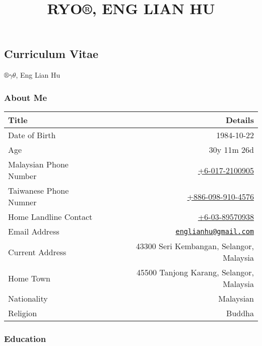 \documentclass[]{article}
\title{RYO®, ENG LIAN HU}
\author{}
\date{}
\begin{document}
\maketitle

{
\hypersetup{linkcolor=black}
\setcounter{tocdepth}{2}
\tableofcontents
}
\subsection{Curriculum Vitae}\label{curriculum-vitae}

\(®γθ\), Eng Lian Hu

\subsubsection{About Me}\label{about-me}

\begin{longtable}[c]{@{}lr@{}}
\toprule
\textbf{Title} & \textbf{Details}\tabularnewline
\midrule
\endhead
Date of Birth & 1984-10-22\tabularnewline
Age & 30y 11m 26d\tabularnewline
Malaysian Phone Number &
\href{tel:+60172100905}{+6-017-2100905}\tabularnewline
Taiwanese Phone Numner &
\href{tel:+8860989104576}{+886-098-910-4576}\tabularnewline
Home Landline Contact &
\href{tel:+60389570938}{+6-03-89570938}\tabularnewline
Email Address &
\href{mailto:englianhu@gmail.com}{\nolinkurl{englianhu@gmail.com}}\tabularnewline
Current Address & 43300 Seri Kembangan, Selangor,
Malaysia\tabularnewline
Home Town & 45500 Tanjong Karang, Selangor, Malaysia\tabularnewline
Nationality & Malaysian\tabularnewline
Religion & Buddha\tabularnewline
\bottomrule
\end{longtable}

\subsubsection{Education}\label{education}
\end{document}
